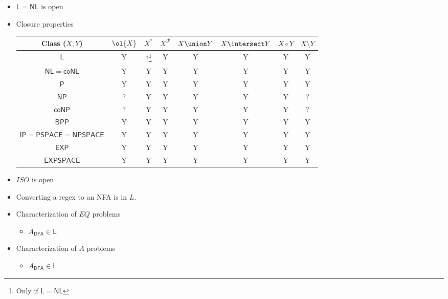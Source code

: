 \documentclass{scrartcl}
\begin{document}
\begin{itemize}
	\item \(\mathsf{L} = \mathsf{NL}\) is open
	\item Closure properties
	\begin{center}
		\begin{tabular}{c c c c c c c c} \toprule
			Class (\(X, Y\)) & \(\ol{X}\) & \(X^*\) & \(X^{\mathcal R}\) & \(X \union Y\) & \(X \intersect Y\) & \(X \circ Y\) & \(X \setminus Y\) \\ \midrule
      \(\mathsf{L}\) & Y & ?\footnote{Only if \(\mathsf{L} = \mathsf{NL}\)} & Y & Y & Y & Y & Y \\ %
			\(\mathsf{NL} = \mathsf{coNL}\) & Y & Y & Y & Y & Y & Y & Y \\
			\(\mathsf{P}\) & Y & Y & Y & Y & Y & Y & Y \\
			\(\mathsf{NP}\) & ? & Y & Y & Y & Y & Y & ? \\ %
			\(\mathsf{coNP}\) & ? & Y & Y & Y & Y & Y & ? \\ %
			\(\mathsf{BPP}\) & Y & Y & Y & Y & Y & Y & Y \\
			\(\mathsf{IP} = \mathsf{PSPACE} = \mathsf{NPSPACE}\) & Y & Y & Y & Y & Y & Y & Y \\
			\(\mathsf{EXP}\) & Y & Y & Y & Y & Y & Y & Y \\
			\(\mathsf{EXPSPACE}\) & Y & Y & Y & Y & Y & Y & Y \\ \bottomrule
		\end{tabular}
	\end{center}
	\item \(\textit{ISO}\) is open
	\item Converting a regex to an \textsf{NFA} is in \(L\).
	\item Characterization of \(EQ\) problems
	\begin{itemize}
		\item \(A_{\textsf{DFA}} \in \mathsf{L}\)
	\end{itemize}
	\item Characterization of \(A\) problems
	\begin{itemize}
		\item \(A_{\textsf{DFA}} \in \mathsf{L}\)
	\end{itemize}
\end{itemize}
\end{document}
